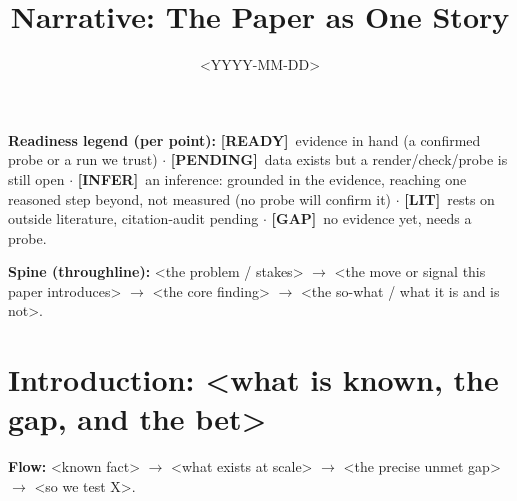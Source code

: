 \documentclass[11pt]{article}
\title{Narrative: The Paper as One Story}
\date{<YYYY-MM-DD>}
\newcommand{\rdy}{\textcolor{cReady}{\textbf{[READY]}}}   %
\newcommand{\pend}{\textcolor{cPend}{\textbf{[PENDING]}}} %
\newcommand{\lit}{\textcolor{cLit}{\textbf{[LIT]}}}       %
\newcommand{\gp}{\textcolor{cGap}{\textbf{[GAP]}}}        %
\newcommand{\infr}{\textcolor{cInfer}{\textbf{[INFER]}}}  %
\newcommand{\rev}[2]{\\{\footnotesize\color{gray}$\hookrightarrow$~\textbf{#1}~#2}}
\newcommand{\fb}[4]{\\{\footnotesize\color{cFb}$\hookrightarrow$~\textbf{#1}~[\textbf{#2}]~\emph{``#3''}~$\Rightarrow$~#4}}
\begin{document}
\maketitle

\noindent\footnotesize\textbf{Readiness legend (per point):}
\rdy~evidence in hand (a confirmed probe or a run we trust) $\cdot$
\pend~data exists but a render/check/probe is still open $\cdot$
\infr~an inference: grounded in the evidence, reaching one reasoned step beyond, not measured (no probe will confirm it) $\cdot$
\lit~rests on outside literature, citation-audit pending $\cdot$
\gp~no evidence yet, needs a probe.\normalsize

\medskip
\noindent\textbf{Spine (throughline):} <the problem / stakes> $\rightarrow$ <the move or signal this paper introduces> $\rightarrow$ <the core finding> $\rightarrow$ <the so-what / what it is and is not>.

%
%

\section*{Introduction: <what is known, the gap, and the bet>}

\noindent\textbf{Flow:} <known fact> $\rightarrow$ <what exists at scale> $\rightarrow$ <the precise unmet gap> $\rightarrow$ <so we test X>.
\end{document}
